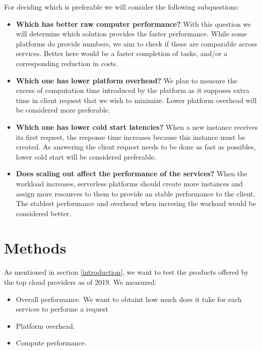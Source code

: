 \documentclass[11pt]{article}
\begin{document}
For deciding which is preferable we will consider the following subquestions:

\begin{itemize}
\item \textbf{Which has better raw computer performance?} With this question we will determine which solution provides the faster performance. While some platforms do provide numbers, we aim to check if these are comparable across services. Better here would be a faster completion of tasks, and/or a corresponding reduction in costs.

\item \textbf{Which one has lower platform overhead?}  We plan to measure the excess of computation time introduced by the platform as it supposes extra time in client request that we wish to minimize. Lower platform overhead will be considered more preferable.

\item \textbf{Which one has lower cold start latencies?} When a new instance receives its first request, the response time increases because this instance must be created. As answering the client request needs to be done as fast as possibles, lower cold start will be considered preferable.

\item \textbf{Does scaling out affect the performance of the services?} When the workload increases, serverless platforms should create more instances and assign more resources to them to provide an stable performance to the client. The stablest performance and overhead when incresing the workoad would be considered better.  
\end{itemize}





\section{Methods}
\label{methods}
As mentioned in section \ref{introduction}, we want to test the products offered by the top cloud providers as of 2019. We measured:

\begin{itemize}
\item Overall performance. We want to obtaint how much does it take for each services to performe a request
\item Platform overhead.
\item Compute performance.
\end{itemize}
\end{document}
